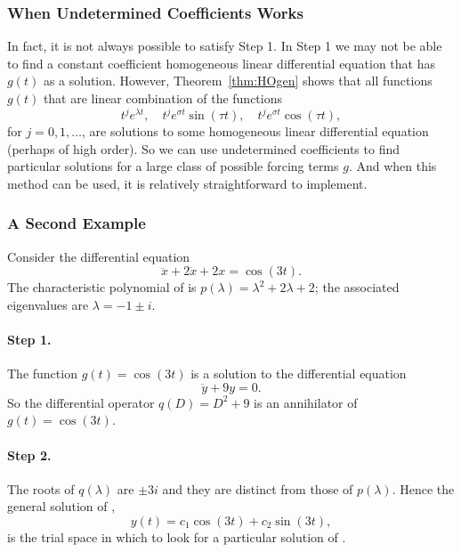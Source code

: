 \documentclass{ximera}
\begin{document}
\subsubsection*{When Undetermined Coefficients Works}

In fact, it is not always possible to satisfy Step 1.  In Step 1 we may not 
be able to find a constant coefficient homogeneous linear differential 
equation that has $g(t)$ as a solution.  However, Theorem~\ref{thm:HOgen} 
shows that all functions $g(t)$ that are 
linear combination of the functions
\[
t^je^{\lambda t},\quad t^je^{\sigma t}\sin(\tau t),\quad 
t^je^{\sigma t}\cos(\tau t),
\]
for $j=0,1,\ldots$, are solutions to some homogeneous linear differential 
equation (perhaps of high order).  So we can use 
undetermined coefficients to 
find particular solutions for a large class of possible forcing terms $g$.  
And when this method can be used, it is relatively straightforward to implement.


\subsubsection*{A Second Example}

Consider the differential equation
\begin{equation}  \label{e:undet1}
\ddot x + 2\dot x + 2x = \cos(3t).
\end{equation}
The characteristic polynomial of  is 
$p(\lambda)=\lambda^2+2\lambda+2$; the associated eigenvalues are 
$\lambda=-1\pm i$.

\paragraph{Step 1.} The function $g(t)=\cos(3t)$ is a solution to the 
differential equation
\begin{equation}  \label{e:undet2}
\ddot y + 9y=0.
\end{equation}
So the differential operator $q(D)=D^2+9$ is an 
annihilator of $g(t)=\cos(3t)$. 

\paragraph{Step 2.} The roots of $q(\lambda)$ are $\pm 3i$ and they are 
distinct from those of $p(\lambda)$.  Hence the 
general solution of , 
\begin{equation}   \label{E:undet2}
y(t) = c_1 \cos(3t)+ c_2 \sin(3t),
\end{equation}
is the trial space in which to look for a 
particular solution of .
\end{document}
